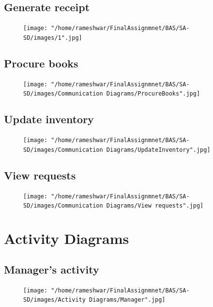 \documentclass{scrreprt}
\begin{document}
\subsection{Generate receipt}
\begin{figure}[!htb]
  \texttt{[image: "/home/rameshwar/FinalAssignmnet/BAS/SA-SD/images/1".jpg]}

  \label{fig:seqdiagram}
\end{figure}

\clearpage
\subsection{Procure books}
\begin{figure}[!htb]
  \texttt{[image: "/home/rameshwar/FinalAssignmnet/BAS/SA-SD/images/Communication Diagrams/ProcureBooks".jpg]}
   \label{fig:seqdiagram}
\end{figure}


\subsection{Update inventory}
\begin{figure}[!htb]
  \texttt{[image: "/home/rameshwar/FinalAssignmnet/BAS/SA-SD/images/Communication Diagrams/UpdateInventory".jpg]}
   \label{fig:seqdiagram}
\end{figure}


\subsection{View requests}
\begin{figure}[!htb]
  \texttt{[image: "/home/rameshwar/FinalAssignmnet/BAS/SA-SD/images/Communication Diagrams/View requests".jpg]}
   \label{fig:seqdiagram}
\end{figure}

\section{Activity Diagrams}

\subsection{Manager's activity}
\begin{figure}[!htb]
  \texttt{[image: "/home/rameshwar/FinalAssignmnet/BAS/SA-SD/images/Activity Diagrams/Manager".jpg]}
   \label{fig:seqdiagram}
\end{figure}
\end{document}
